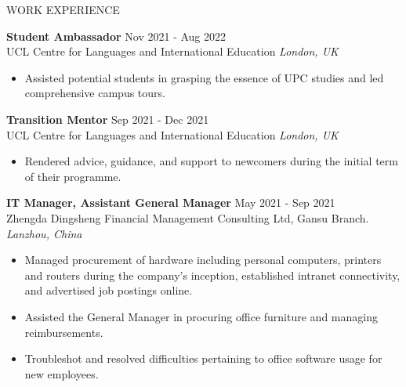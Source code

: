 \documentclass{resume} %
\begin{document}
\begin{rSection}{WORK EXPERIENCE}
    
    \textbf{Student Ambassador} \hfill Nov 2021 - Aug 2022\\
    UCL Centre for Languages and International Education \hfill \textit{London, UK}
    \begin{itemize}
        \itemsep -3pt {} 
        \item Assisted potential students in grasping the essence of UPC studies and led comprehensive campus tours.
    \end{itemize}
    
    \textbf{Transition Mentor} \hfill Sep 2021 - Dec 2021\\
    UCL Centre for Languages and International Education \hfill \textit{London, UK}
    \begin{itemize}
        \itemsep -3pt {} 
        \item Rendered advice, guidance, and support to newcomers during the initial term of their programme.
    \end{itemize}
     
    \textbf{IT Manager, Assistant General Manager} \hfill May 2021 - Sep 2021\\
    Zhengda Dingsheng Financial Management Consulting Ltd, Gansu Branch. \hfill \textit{Lanzhou, China}
    \begin{itemize}
        \itemsep -3pt {} 
        \item Managed procurement of hardware including personal computers, printers and routers during the company's inception, established intranet connectivity, and advertised job postings online.
        \item Assisted the General Manager in procuring office furniture and managing reimbursements.
        \item Troubleshot and resolved difficulties pertaining to office software usage for new employees.
    \end{itemize}
    
\end{rSection} 
    
\end{document}
